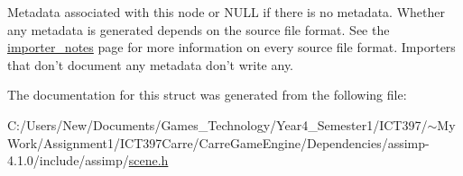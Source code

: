 Metadata associated with this node or NULL if there is no metadata. Whether any metadata is generated depends on the source file format. See the \hyperlink{}{importer\_\-notes} page for more information on every source file format. Importers that don't document any metadata don't write any. 

The documentation for this struct was generated from the following file:\begin{CompactItemize}
\item 
C:/Users/New/Documents/Games\_\-Technology/Year4\_\-Semester1/ICT397/$\sim$My Work/Assignment1/ICT397Carre/CarreGameEngine/Dependencies/assimp-4.1.0/include/assimp/\hyperlink{scene_8h}{scene.h}\end{CompactItemize}
